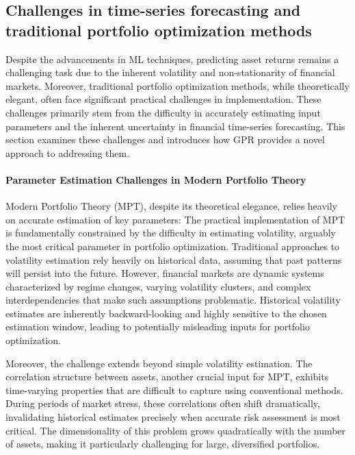 \subsection{Challenges in time-series forecasting and traditional portfolio optimization methods}
Despite the advancements in \ac{ML} techniques, predicting asset returns remains a challenging task due to the inherent volatility and non-stationarity of financial markets.
Moreover, traditional portfolio optimization methods, while theoretically elegant, often face significant practical challenges in implementation. These challenges primarily stem from the difficulty in accurately estimating input parameters and the inherent uncertainty in financial time-series forecasting. 
This section examines these challenges and introduces how \ac{GPR} provides a novel approach to addressing them.

\paragraph{Parameter Estimation Challenges in Modern Portfolio Theory}
Modern Portfolio Theory (MPT), despite its theoretical elegance, relies heavily on accurate estimation of key parameters:
The practical implementation of MPT is fundamentally constrained by the difficulty in estimating volatility, arguably the most critical parameter in portfolio optimization. Traditional approaches to volatility estimation rely heavily on historical data, assuming that past patterns will persist into the future. However, financial markets are dynamic systems characterized by regime changes, varying volatility clusters, and complex interdependencies that make such assumptions problematic. Historical volatility estimates are inherently backward-looking and highly sensitive to the chosen estimation window, leading to potentially misleading inputs for portfolio optimization.

Moreover, the challenge extends beyond simple volatility estimation. The correlation structure between assets, another crucial input for MPT, exhibits time-varying properties that are difficult to capture using conventional methods. During periods of market stress, these correlations often shift dramatically, invalidating historical estimates precisely when accurate risk assessment is most critical. The dimensionality of this problem grows quadratically with the number of assets, making it particularly challenging for large, diversified portfolios.

